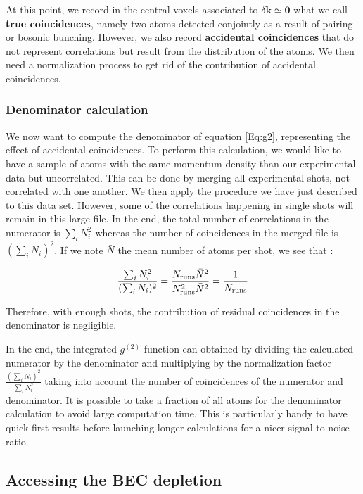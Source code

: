 At this point, we record in the central voxels associated to $\delta \bm{k} \simeq \bm{0}$ what we call \textbf{true coincidences}, namely two atoms detected conjointly as a result of \kmk pairing or bosonic bunching. However, we also record \textbf{accidental coincidences} that do not represent correlations but result from the distribution of the atoms. We then need a normalization process to get rid of the contribution of accidental coincidences. 

\subsubsection{Denominator calculation}

\label{sec:algo}

We now want to compute the denominator of equation \ref{Eq:g2}, representing the effect of accidental coincidences. To perform this calculation, we would like to have a sample of atoms with the same momentum density than our experimental data but uncorrelated. This can be done by merging all experimental shots, not correlated with one another. We then apply the procedure we have just described to this data set. However, some of the correlations happening in single shots will remain in this large file. In the end, the total number of correlations in the numerator is $\sum_i N_i^2$ whereas the number of coincidences in the merged file is $(\sum_i N_i)^2$. If we note $\bar{N}$ the mean number of atoms per shot, we see that :

\begin{equation}
      \frac{\sum_i N_i^2}{(\sum_i N_i)^2}=\frac{N_{\rm{runs}} \bar{N}^2}{N_{\rm{runs}}^2 \bar{N}^2}=\frac{1}{N_{\rm{runs}}}
\end{equation}{}

Therefore, with enough shots, the contribution of residual coincidences in the denominator is negligible. 

In the end, the integrated $g^{(2)}$ function can obtained by dividing the calculated numerator by the denominator and multiplying by the normalization factor $\frac{(\sum_i N_i)^2}{\sum_i N_i^2}$ taking into account the number of coincidences of the numerator and denominator. It is possible to take a fraction of all atoms for the denominator calculation to avoid large computation time. This is particularly handy to have quick first results before launching longer calculations for a nicer signal-to-noise ratio.

\subsection{Accessing the BEC depletion}
\label{sec:accessing_depletion}

